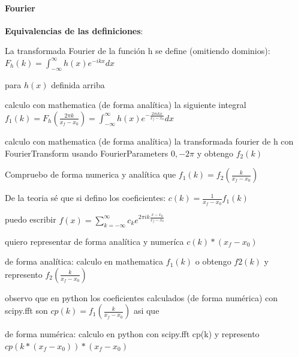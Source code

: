 \documentclass{article}
\begin{document}
\paragraph{Fourier}
\textbf{Equivalencias de las definiciones}:

\begin{description}
\item La transformada Fourier de la función h se define  (omitiendo dominios):
$F_h(k) = \int_{- \infty}^{\infty}{h(x) e^{-i k x} dx } $
 
\item para $h(x)$ definida arriba

\item calculo con mathematica (de forma analítica) la siguiente integral
$f_1(k)=F_h(\frac{2\pi k}{x_f - x_0} ) = \int_{- \infty}^{\infty}{h(x) e^{-\frac{2 \pi i k x }{x_f - x_0}} dx } $

\item calculo con mathematica (de forma analítica) la transformada fourier de h con FourierTransform usando FourierParameters $0, -2\pi$  y obtengo $f_2(k)$

\item Compruebo de forma numerica y analítica que
$f_1(k) = f_2(\frac{k}{x_f - x_0})$

\item De la teoria sé que si defino los coeficientes: $c(k) = \frac{1}{x_f - x_0} f_1(k) $
\item  puedo escribir $f(x) = \sum_{k=-\infty}^{\infty} c_k e^{2 \pi i k \frac{x-x_0}{x_f - x_0}}$

\item quiero representar de forma analítica y numeríca $c(k) * (x_f-x_0)$
\item de forma analítica: calculo en mathematica $f_1(k)$ o obtengo $f2(k)$ y represento  $f_2(\frac{k}{x_f - x_0})$

\item observo que en python los coeficientes calculados (de forma numérica) con scipy.fft son $cp(k) = f_1(\frac{k}{x_f-x_0})$ asi que 
\item de forma numérica: calculo en python con scipy.fft cp(k) y  represento $cp(k* (x_f - x_0))* (x_f - x_0)$  
\end{description}
\end{document}
